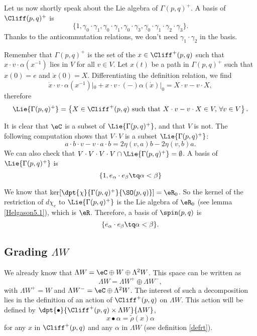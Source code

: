 Let us now shortly speak about the Lie algebra of $\Gamma(p,q)^+$. A basis of $\Cliff(p,q)^+$ is \[\{1,\gamma_0\cdot\gamma_1,\gamma_0\cdot\gamma_1 ,\gamma_0\cdot\gamma_3
,\gamma_0\cdot\gamma_1\cdot\gamma_2\cdot\gamma_3  \}.\] Thanks to the anticommutation relations, we don't need $\gamma_1\cdot\gamma_2$ in the basis.

Remember that $\Gamma(p,q)^+$ is the set of the $x\in\Cliff^+(p,q)$ such that $x\cdot v\cdot\alpha(x^{-1})$ lies in $V$ for all $v\in V$. Let $x(t)$ be a path in $\Gamma(p,q)^+$ such that $x(0)=e$ and $\dot{x}(0)=X$. Differentiating the definition relation, we find
 \[
 \dot{x}\cdot v\cdot\alpha(x^{-1})|_0+x\cdot v\cdot(-)\alpha(\dot{x})|_0=X\cdot v-v\cdot X,
 \]
 therefore
\[
  \Lie{\Gamma(p,q)^+}=\left\{X\in\Cliff^+(p,q)\textrm{ such that } X\cdot v-v\cdot X\in V,\,\forall v\in V\right\}.
\]

It is clear that $\eC$ is a subset of $\Lie{\Gamma(p,q)^+}$, and that $V$ is not. The following computation shows that $V\cdot V$ is a subset $\Lie{\Gamma(p,q)^+}$:
\[
         a\cdot b\cdot v-v\cdot a\cdot b=2\eta(v,a)b-2\eta(v,b)a.
\]
 We can also check that $V\cdot V\cdot V\cdot V\cap\Lie{\Gamma(p,q)^+}=\emptyset$. A basis of $\Lie{\Gamma(p,q)^+}$ is
\[
	\{ 1,e_{\alpha}\cdot e_{\beta}\tq \alpha<\beta \}
\]

 We know that $\ker[\dpt{\chi}{\Gamma(p,q)^+}{\SO(p,q)}]=\eR_0$. So the kernel of the restriction of $d\chi_e$ to $\Lie{\Gamma(p,q)^+}$ is the Lie algebra of $\eR_0$ (see lemma \ref{Helgason5.1}), which is $\eR$. Therefore, a basis of $\spin(p,q)$ is 
\[
	\{e_{\alpha}\cdot e_{\beta}\tq \alpha<\beta\}.
\]

\subsection{Grading \texorpdfstring{$\Lambda W$}{LW}}

We already know that $\Lambda W=\eC\oplus W\oplus\Lambda^2W$. This space can be written as \[\Lambda W =\Lambda W^+\oplus\Lambda W^-,\] with $\Lambda W^+=W$ and $\Lambda W^-=\eC\oplus\Lambda^2W$. The interest of such a decomposition lies in the definition of an action of $\Cliff^+(p,q)$ on $\Lambda W $. This action will be defined by $\dpt{\bullet}{\Cliff^+(p,q)\times\Lambda W }{\Lambda W }$, 
  \[
 x\bullet\alpha=\tilde\rho(x)\alpha
 \]
for any $x$ in $\Cliff^+(p,q)$ and any $\alpha$ in $\Lambda W $ (see definition \ref{defrt}).

